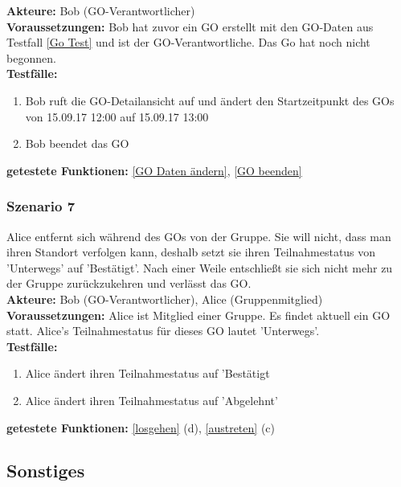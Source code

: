 \documentclass[parskip=full]{scrartcl}
\def\threedigits#1{%
  \ifnum#1<100 0\fi
  \ifnum#1<10 0\fi
  \number#1}
\begin{document}
\textbf{Akteure:} Bob (GO-Verantwortlicher)\\

\textbf{Voraussetzungen: }Bob hat zuvor ein GO erstellt mit den GO-Daten aus Testfall \ref{Go Test} und ist der GO-Verantwortliche. Das Go hat noch nicht begonnen.\\

\textbf{Testfälle:}
\begin{enumerate}[label={\textbf{/T\protect\threedigits{\theenumi}0/}}, leftmargin=*, resume]
	\item Bob ruft die GO-Detailansicht auf und ändert den Startzeitpunkt des GOs von 15.09.17 12:00 auf 15.09.17 13:00
	\item Bob beendet das GO
\end{enumerate}

\textbf{getestete Funktionen: }\ref{GO Daten ändern}, \ref{GO beenden}

\subsubsection*{Szenario 7}Alice entfernt sich während des GOs von der Gruppe. Sie will nicht, dass man ihren Standort verfolgen kann, deshalb setzt sie ihren Teilnahmestatus von 'Unterwegs' auf 'Bestätigt'. Nach einer Weile entschließt sie sich nicht mehr zu der Gruppe zurückzukehren und verlässt das GO.\\

\textbf{Akteure:} Bob (GO-Verantwortlicher), Alice (Gruppenmitglied)\\

\textbf{Voraussetzungen: }Alice ist Mitglied einer Gruppe. Es findet aktuell ein GO statt. Alice's Teilnahmestatus für dieses GO lautet 'Unterwegs'.\\

\textbf{Testfälle:}
\begin{enumerate}[label={\textbf{/T\protect\threedigits{\theenumi}0/}}, leftmargin=*, resume]
	\item Alice ändert ihren Teilnahmestatus auf 'Bestätigt
	\item Alice ändert ihren Teilnahmestatus auf 'Abgelehnt'
\end{enumerate}

\textbf{getestete Funktionen: }\ref{losgehen} (d), \ref{austreten} (c)

\subsection{Sonstiges}
\end{document}
